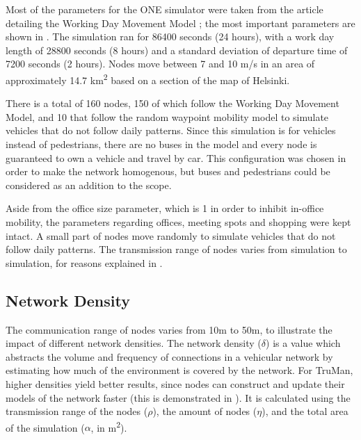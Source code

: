 Most of the parameters for the ONE simulator were taken from the article detailing the Working Day Movement Model \citep{ekman2008working}; the most important parameters are shown in .
The simulation ran for 86400 seconds (24 hours), with a work day length of 28800 seconds (8 hours) and a standard deviation of departure time of 7200 seconds (2 hours).
Nodes move between 7 and 10 m/s in an area of approximately 14.7 km\textsuperscript{2} based on a section of the map of Helsinki.

There is a total of 160 nodes, 150 of which follow the Working Day Movement Model, and 10 that follow the random waypoint mobility model to simulate vehicles that do not follow daily patterns.
Since this simulation is for vehicles instead of pedestrians, there are no buses in the model and every node is guaranteed to own a vehicle and travel by car.
This configuration was chosen in order to make the network homogenous, but buses and pedestrians could be considered as an addition to the scope.

Aside from the office size parameter, which is 1 in order to inhibit in-office mobility, the parameters regarding offices, meeting spots and shopping were kept intact.
A small part of nodes move randomly to simulate vehicles that do not follow daily patterns.
The transmission range of nodes varies from simulation to simulation, for reasons explained in .

\subsection{Network Density}
\label{section:density}


The communication range of nodes varies from 10m to 50m, to illustrate the impact of different network densities.
The network density ($\delta$) is a value which abstracts the volume and frequency of connections in a vehicular network by estimating how much of the environment is covered by the network.
For TruMan, higher densities yield better results, since nodes can construct and update their models of the network faster (this is demonstrated in ).
It is calculated using the transmission range of the nodes ($\rho$), the amount of nodes ($\eta$), and the total area of the simulation ($\alpha$, in m\textsuperscript{2}).

